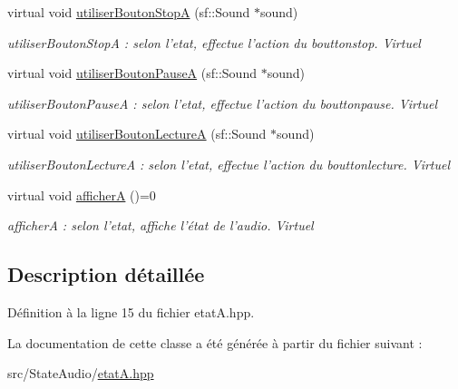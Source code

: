 \begin{DoxyCompactItemize}
\item 
\hypertarget{classEtatA_a8e1a9dfd3470c1230c28b3e326330f4c}{virtual void \hyperlink{classEtatA_a8e1a9dfd3470c1230c28b3e326330f4c}{utiliser\+Bouton\+Stop\+A} (sf\+::\+Sound $\ast$sound)}\label{classEtatA_a8e1a9dfd3470c1230c28b3e326330f4c}

\begin{DoxyCompactList}\small\item\em utiliser\+Bouton\+Stop\+A \+: selon l'etat, effectue l'action du bouttonstop. Virtuel \end{DoxyCompactList}\item 
\hypertarget{classEtatA_aa3a201e53fafd92629cbd9634a037c8e}{virtual void \hyperlink{classEtatA_aa3a201e53fafd92629cbd9634a037c8e}{utiliser\+Bouton\+Pause\+A} (sf\+::\+Sound $\ast$sound)}\label{classEtatA_aa3a201e53fafd92629cbd9634a037c8e}

\begin{DoxyCompactList}\small\item\em utiliser\+Bouton\+Pause\+A \+: selon l'etat, effectue l'action du bouttonpause. Virtuel \end{DoxyCompactList}\item 
\hypertarget{classEtatA_a268ddc5db2a85a859d3d81a897bd47c8}{virtual void \hyperlink{classEtatA_a268ddc5db2a85a859d3d81a897bd47c8}{utiliser\+Bouton\+Lecture\+A} (sf\+::\+Sound $\ast$sound)}\label{classEtatA_a268ddc5db2a85a859d3d81a897bd47c8}

\begin{DoxyCompactList}\small\item\em utiliser\+Bouton\+Lecture\+A \+: selon l'etat, effectue l'action du bouttonlecture. Virtuel \end{DoxyCompactList}\item 
\hypertarget{classEtatA_abd2d754e4d12f3fbbd5b9cf06bfe1a21}{virtual void \hyperlink{classEtatA_abd2d754e4d12f3fbbd5b9cf06bfe1a21}{afficher\+A} ()=0}\label{classEtatA_abd2d754e4d12f3fbbd5b9cf06bfe1a21}

\begin{DoxyCompactList}\small\item\em afficher\+A \+: selon l'etat, affiche l'état de l'audio. Virtuel \end{DoxyCompactList}\end{DoxyCompactItemize}


\subsection{Description détaillée}


Définition à la ligne 15 du fichier etat\+A.\+hpp.



La documentation de cette classe a été générée à partir du fichier suivant \+:\begin{DoxyCompactItemize}
\item 
src/\+State\+Audio/\hyperlink{etatA_8hpp}{etat\+A.\+hpp}\end{DoxyCompactItemize}
